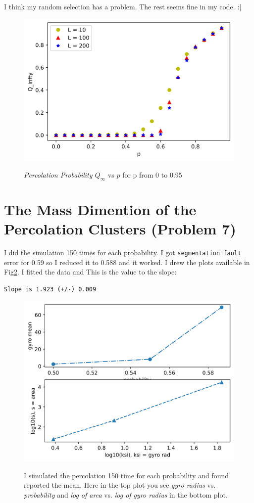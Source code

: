 \documentclass[12pt]{article}
\begin{document}
	I think my random selection has a problem. The rest seems fine in my code. :|
	\begin{figure}[h!]
		\includegraphics[width=0.9\linewidth]{../p4/percProb.jpg}
		\label{fig:percProb}
		\caption{\emph{Percolation Probability $Q_\infty$} vs \emph{$p$} for p from 0 to 0.95}
	\end{figure}
	\section{The Mass Dimention of the Percolation Clusters (Problem 7)}
	I did the simulation 150 times for each probability. I got \texttt{segmentation fault} error for 0.59 so I reduced it to 0.588 and it worked.
	I drew the plots available in Fig\ref{fig:area-gyro}.
	I fitted the data and This is the value to the slope:\\
	\centerline{\texttt{Slope is 1.923 (+/-) 0.009}}
	\begin{figure}[h!]
		\centering
		\includegraphics[width=0.9\linewidth]{../p7/area-gyro.jpg}
		\label{fig:area-gyro}
		\caption{I simulated the percolation 150 time for each probability and found reported the mean. Here
		in the top plot you see \emph{gyro radius} vs. \emph{probability}
		and \emph{log of area} vs. \emph{log of gyro radius} in the bottom plot.}
	\end{figure}
\end{document}
